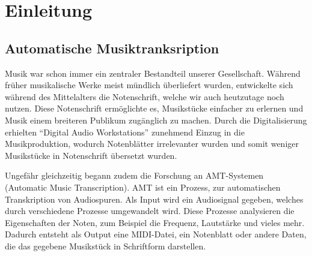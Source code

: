 \section{Einleitung}
\subsection{Automatische Musiktranksription}
Musik war schon immer ein zentraler Bestandteil unserer Gesellschaft.
Während früher musikalische Werke meist mündlich überliefert wurden,
entwickelte sich während des Mittelalters die Notenschrift, welche wir auch heutzutage noch nutzen.
Diese Notenschrift ermöglichte es, Musikstücke einfacher zu erlernen und Musik einem breiteren Publikum zugänglich zu machen.
Durch die Digitalisierung erhielten \enquote{Digital Audio Workstations} zunehmend Einzug in die Musikproduktion,
wodurch Notenblätter irrelevanter wurden und somit weniger Musikstücke in Notenschrift übersetzt wurden.

Ungefähr gleichzeitig begann zudem die Forschung an AMT-Systemen (Automatic Music Transcription).
AMT ist ein Prozess, zur automatischen Transkription von Audiospuren.
Als Input wird ein Audiosignal gegeben, welches durch verschiedene Prozesse umgewandelt wird.
Diese Prozesse analysieren die Eigenschaften der Noten, zum Beispiel die Frequenz, Lautstärke und vieles mehr.
Dadurch entsteht als Output eine MIDI-Datei, ein Notenblatt oder andere Daten,
die das gegebene Musikstück in Schriftform darstellen.

